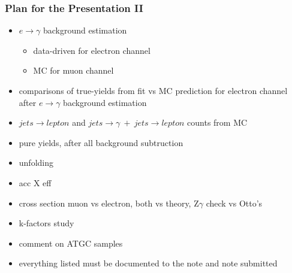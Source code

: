 \documentclass{beamer}
\begin{document}
\begin{frame}\frametitle{Plan for the Presentation II} 
    \scriptsize
    \begin{itemize}
      \item $e \rightarrow \gamma$ background estimation 
      \begin{itemize}
    \scriptsize
         \item data-driven for electron channel 
         \item MC for muon channel
      \end{itemize}
      \item comparisons of true-yields from fit vs MC prediction for electron channel after $e \rightarrow \gamma$ background estimation 
      \item $jets \rightarrow lepton$ and $jets \rightarrow \gamma~+~jets \rightarrow lepton$ counts from MC
      \item pure yields, after all background subtruction
      \item unfolding
      \item acc X eff
      \item cross section muon vs electron, both vs theory, Z$\gamma$ check vs Otto's
      \item k-factors study
      \item comment on ATGC samples
      \item everything listed must be documented to the note and note submitted
    \end{itemize}
\end{frame} 
\end{document}
